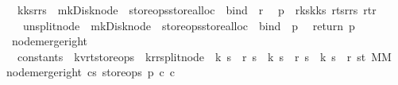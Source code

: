\begin{isabellebody}
\ \ {\isacharparenleft}k{}{\isacharhash}ks{}{\isacharcomma}r{}{\isacharhash}rs{}{\isacharparenright}\ {\isacharbar}{\isachargreater}\ mk{\isacharunderscore}Disk{\isacharunderscore}node\ {\isacharbar}{\isachargreater}\ {\isacharparenleft}store{\isacharunderscore}ops{\isacharbar}{\isachargreater}store{\isacharunderscore}alloc{\isacharparenright}\ {\isacharbar}{\isachargreater}\ bind\ {\isacharparenleft}{\isacharpercent}\ r{}{\isachardot}\isanewline
\ \ p\ {\isasymlparr}\ r{\isacharunderscore}ks{}{\isacharcolon}{\isacharequal}k{}{\isacharhash}ks{}{\isacharcomma}\ r{\isacharunderscore}ts{}{\isacharcolon}{\isacharequal}r{}{\isacharhash}rs{}{\isacharcomma}\ r{\isacharunderscore}t{\isacharcolon}{\isacharequal}r{}\ {\isasymrparr}\isanewline
\ \ {\isacharbar}{\isachargreater}\ unsplit{\isacharunderscore}node\ {\isacharbar}{\isachargreater}\ mk{\isacharunderscore}Disk{\isacharunderscore}node\ {\isacharbar}{\isachargreater}\ {\isacharparenleft}store{\isacharunderscore}ops{\isacharbar}{\isachargreater}store{\isacharunderscore}alloc{\isacharparenright}\ {\isacharbar}{\isachargreater}\ bind\ {\isacharparenleft}{\isacharpercent}\ p{\isachardot}\isanewline
\ \ return\ p{\isacharparenright}{\isacharparenright}{\isacharparenright}{\isacharparenright}{\isachardoublequoteclose}\isanewline
\isanewline
\isanewline
\isanewline
\isanewline
\isanewline
{}\isamarkupfalse%
\ node{\isacharunderscore}merge{\isacharunderscore}right\ {\isacharcolon}{\isacharcolon}\ \isanewline
\ \ {\isachardoublequoteopen}constants\ {\isasymRightarrow}\ {\isacharparenleft}{\isacharprime}k{\isacharcomma}{\isacharprime}v{\isacharcomma}{\isacharprime}r{\isacharcomma}{\isacharprime}t{\isacharparenright}store{\isacharunderscore}ops\ {\isasymRightarrow}\ {\isacharparenleft}{\isacharprime}k{\isacharcomma}{\isacharprime}r{\isacharparenright}rsplit{\isacharunderscore}node\ {\isasymRightarrow}\ {\isacharparenleft}{\isacharprime}k\ s\ {\isacharasterisk}\ {\isacharprime}r\ s{\isacharparenright}\ {\isasymRightarrow}\ {\isacharparenleft}{\isacharprime}k\ s\ {\isacharasterisk}\ {\isacharprime}r\ s{\isacharparenright}\ {\isasymRightarrow}\ {\isacharparenleft}{\isacharprime}k\ s\ {\isacharasterisk}\ {\isacharprime}r\ s{\isacharcomma}{\isacharprime}t{\isacharparenright}\ MM{\isachardoublequoteclose}\isanewline
{}\isanewline
{\isachardoublequoteopen}node{\isacharunderscore}merge{\isacharunderscore}right\ cs\ store{\isacharunderscore}ops\ p\ c{}\ c{}\ {\isacharequal}\ {\isacharparenleft}\isanewline

\end{isabellebody}

